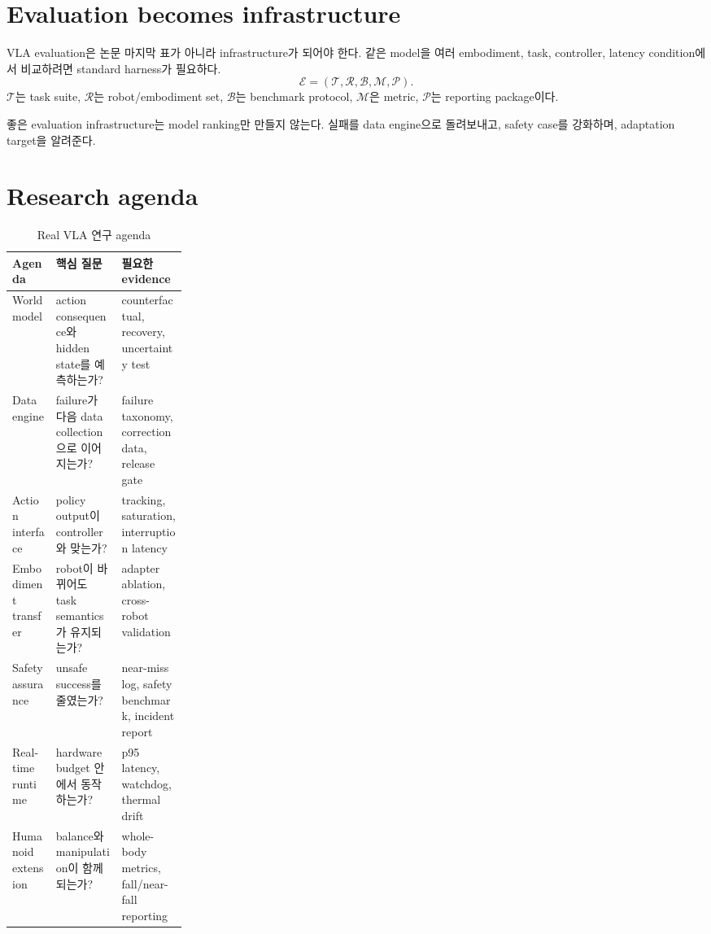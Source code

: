 \section{Evaluation becomes infrastructure}

VLA evaluation은 논문 마지막 표가 아니라 infrastructure가 되어야 한다. 같은 model을 여러 embodiment, task, controller, latency condition에서 비교하려면 standard harness가 필요하다.
\begin{equation}
  \mathcal{E}
  =
  (
  \mathcal{T},
  \mathcal{R},
  \mathcal{B},
  \mathcal{M},
  \mathcal{P}
  ).
  \label{eq:ch22-eval-infra}
\end{equation}
$\mathcal{T}$는 task suite, $\mathcal{R}$는 robot/embodiment set, $\mathcal{B}$는 benchmark protocol, $\mathcal{M}$은 metric, $\mathcal{P}$는 reporting package이다.

좋은 evaluation infrastructure는 model ranking만 만들지 않는다. 실패를 data engine으로 돌려보내고, safety case를 강화하며, adaptation target을 알려준다.

\section{Research agenda}

\begin{table}[h]
  \centering
  \caption{Real VLA 연구 agenda}
  \begin{tabularx}{\linewidth}{p{0.25\linewidth}X X}
    \toprule
    Agenda & 핵심 질문 & 필요한 evidence \\
    \midrule
    World model & action consequence와 hidden state를 예측하는가? & counterfactual, recovery, uncertainty test \\
    Data engine & failure가 다음 data collection으로 이어지는가? & failure taxonomy, correction data, release gate \\
    Action interface & policy output이 controller와 맞는가? & tracking, saturation, interruption latency \\
    Embodiment transfer & robot이 바뀌어도 task semantics가 유지되는가? & adapter ablation, cross-robot validation \\
    Safety assurance & unsafe success를 줄였는가? & near-miss log, safety benchmark, incident report \\
    Real-time runtime & hardware budget 안에서 동작하는가? & p95 latency, watchdog, thermal drift \\
    Humanoid extension & balance와 manipulation이 함께 되는가? & whole-body metrics, fall/near-fall reporting \\
    \bottomrule
  \end{tabularx}
  \label{tab:ch22-agenda}
\end{table}

